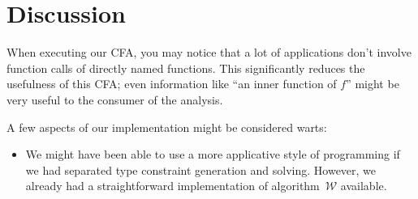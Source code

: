 \documentclass[a4paper]{scrartcl}
\newcommand{\algow}{algorithm~$\mathcal{W}$}
\begin{document}
\section{Discussion}
When executing our CFA, you may notice that a lot of applications don't involve
function calls of directly named functions. This significantly reduces the
usefulness of this CFA; even information like ``an inner function of $f$''
might be very useful to the consumer of the analysis.

A few aspects of our implementation might be considered warts:
\begin{itemize}
\item
    We might have been able to use a more applicative style of programming
    if we had separated type constraint generation and solving. However,
    we already had a straightforward implementation of \algow{} available.
\end{itemize}
\end{document}
